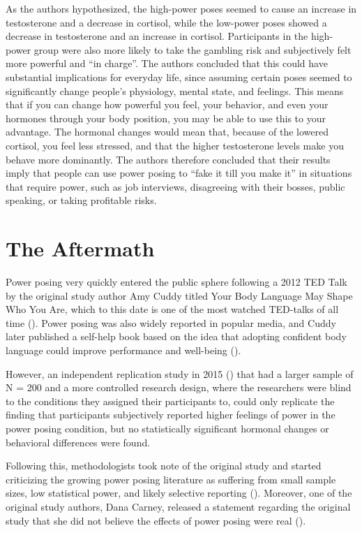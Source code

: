 \documentclass[
  letterpaper,
]{book}
\begin{document}
As the authors hypothesized, the high-power poses seemed to cause an
increase in testosterone and a decrease in cortisol, while the low-power
poses showed a decrease in testosterone and an increase in cortisol.
Participants in the high-power group were also more likely to take the
gambling risk and subjectively felt more powerful and ``in charge''. The
authors concluded that this could have substantial implications for
everyday life, since assuming certain poses seemed to significantly
change people's physiology, mental state, and feelings. This means that
if you can change how powerful you feel, your behavior, and even your
hormones through your body position, you may be able to use this to your
advantage. The hormonal changes would mean that, because of the lowered
cortisol, you feel less stressed, and that the higher testosterone
levels make you behave more dominantly. The authors therefore concluded
that their results imply that people can use power posing to ``fake it
till you make it'' in situations that require power, such as job
interviews, disagreeing with their bosses, public speaking, or taking
profitable risks.

\section{The Aftermath}\label{the-aftermath-25}

Power posing very quickly entered the public sphere following a 2012 TED
Talk by the original study author Amy Cuddy titled Your Body Language
May Shape Who You Are, which to this date is one of the most watched
TED-talks of all time ().
Power posing was also widely reported in popular media, and Cuddy later
published a self-help book based on the idea that adopting confident
body language could improve performance and well-being
().

However, an independent replication study in 2015
() that
had a larger sample of N = 200 and a more controlled research design,
where the researchers were blind to the conditions they assigned their
participants to, could only replicate the finding that participants
subjectively reported higher feelings of power in the power posing
condition, but no statistically significant hormonal changes or
behavioral differences were found.

Following this, methodologists took note of the original study and
started criticizing the growing power posing literature as suffering
from small sample sizes, low statistical power, and likely selective
reporting (). Moreover, one of the original study authors, Dana Carney,
released a statement regarding the original study that she did not
believe the effects of power posing were real
().
\end{document}
